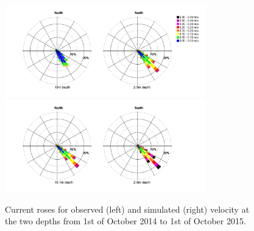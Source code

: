 \begin{figure}[htb]
	\centerline{
		\includegraphics*[trim=2cm 1cm 1cm 0cm,clip=true,height=4cm]{Figurer/Slagen_Rose_obs} 
		\includegraphics*[trim=2cm 1cm 3cm 0cm,clip=true,height=4cm]{Figurer/Slagen_Rose_sim} }
	\caption{\small Current roses for observed (left) and simulated (right) velocity at the two depths from 1st of October 2014 to 1st of October 2015.}
	\label{fig:Slagen-rose}
\end{figure}

